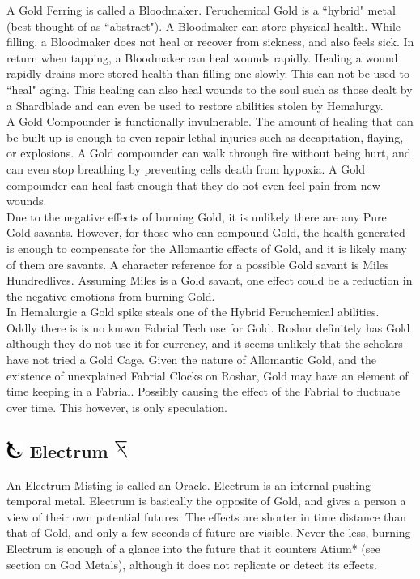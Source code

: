\documentclass[conference]{IEEEtran}
\begin{document}
A Gold Ferring is called a Bloodmaker.  Feruchemical Gold is a ``hybrid" metal (best thought of as ``abstract"). A Bloodmaker can store physical health.  While filling, a Bloodmaker does not heal or recover from sickness, and also feels sick.  In return when tapping, a Bloodmaker can heal wounds rapidly.  Healing a wound rapidly drains more stored health than filling one slowly.  This can not be used to ``heal" aging.  This healing can also heal wounds to the soul such as those dealt by a Shardblade and can even be used to restore abilities stolen by Hemalurgy.\\

A Gold Compounder is functionally invulnerable.  The amount of healing that can be built up is enough to even repair lethal injuries such as decapitation, flaying, or explosions.  A Gold compounder can walk through fire without being hurt, and can even stop breathing by preventing cells death from hypoxia.  A Gold compounder can heal fast enough that they do not even feel pain from new wounds.\\

Due to the negative effects of burning Gold, it is unlikely there are any Pure Gold savants.  However, for those who can compound Gold, the health generated is enough to compensate for the Allomantic effects of Gold, and it is likely many of them are savants.  A character reference for a possible Gold savant is Miles Hundredlives.  Assuming Miles is a Gold savant, one effect could be a reduction in the negative emotions from burning Gold.\\

In Hemalurgic a Gold spike steals one of the Hybrid Feruchemical abilities.\\

Oddly there is is no known Fabrial Tech use for Gold.  Roshar definitely has Gold although they do not use it for currency, and it seems unlikely that the scholars have not tried a Gold Cage.  Given the nature of Allomantic Gold, and the existence of unexplained Fabrial Clocks on Roshar, Gold may have an element of time keeping in a Fabrial.  Possibly causing the effect of the Fabrial to fluctuate over time.  This however, is only speculation.


\subsection*{\includegraphics[height=1em]{images/Electrum.png}  Electrum \includegraphics[height=1em]{images/Electrum_(Feruchemy).png}}
An Electrum Misting is called an Oracle.  Electrum is an internal pushing temporal metal.  Electrum is basically the opposite of Gold, and gives a person a view of their own potential futures.  The effects are shorter in time distance than that of Gold, and only a few seconds of future are visible.  Never-the-less, burning Electrum is enough of a glance into the future that it counters Atium* (see section on God Metals), although it does not replicate or detect its effects.
\end{document}
